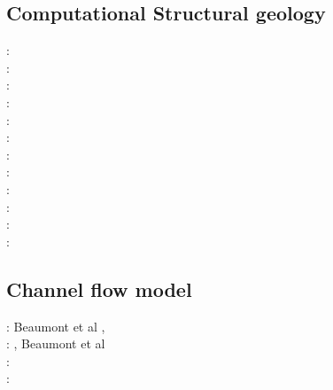 \subsection{Computational Structural geology}

\begin{scriptsize}
\nineteenseventyone: \cite{stbe71}\\
\nineteenninetyfive: \cite{fige95}\\
\twothousand: \cite{acgf00}\cite{trla00}\\
\twothousandone: \cite{masc01}\\
\twothousandeight: \cite{manc08}\cite{scsf08}\\
\twothousandeleven: \cite{frem11}\\
\twothousandthirteen: \cite{soma13}\cite{lehl13}\\
\twothousandfourteen: \cite{olbm14}\\
\twothousandfifteen: \cite{pevp15}\cite{jalr15}\\
\twothousandseventeen: \cite{naam17}\cite{scdu17}\\
\twothousandeighteen: \cite{naam18}\\
\twothousandnineteen: \cite{llor19}\cite{yada19}\cite{sogh19}
\end{scriptsize}

\subsection{Channel flow model} 

\begin{scriptsize}
\twothousandfour: Beaumont et al \cite{bejn04}, \cite{jabm04}\\
\twothousandsix: \cite{jabn06}\cite{mebe06}, Beaumont et al \cite{benj06}\\
\twothousandseven: \cite{jabn07}\\
\twothousandeleven: \cite{jabe11}\\
\end{scriptsize}

